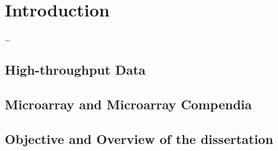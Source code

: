 \chapter{Introduction}\label{ch:introduction}

\ldots

\instructionsintroduction


\section{High-throughput Data}


\section{Microarray and Microarray Compendia}


\section{Objective and Overview of the dissertation}






\cleardoublepage

